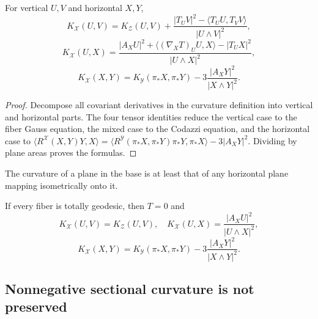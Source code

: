 \begin{theorem}
\label{thm:chow-ii-oneill-curvature-formulas}
For vertical \(U,V\) and horizontal \(X,Y\),
\[
 K_{\mathcal X}(U,V)=K_{\mathcal Z}(U,V)
 +\frac{|T_UV|^2-\langle T_UU,T_VV\rangle}{|U\wedge V|^2},
\]
\[
 K_{\mathcal X}(U,X)=
 \frac{|A_XU|^2+\langle(\nabla_XT)_UU,X\rangle-|T_UX|^2}{|U\wedge X|^2},
\]
\[
 K_{\mathcal X}(X,Y)=K_{\mathcal Y}(\pi_*X,\pi_*Y)
 -3\frac{|A_XY|^2}{|X\wedge Y|^2}.
\]
\end{theorem}
\begin{proof}
Decompose all covariant derivatives in the curvature definition into vertical
and horizontal parts.  The four tensor identities reduce the vertical case
to the fiber Gauss equation, the mixed case to the Codazzi equation, and the
horizontal case to
\(\langle R^{\mathcal X}(X,Y)Y,X\rangle
=\langle R^{\mathcal Y}(\pi_*X,\pi_*Y)\pi_*Y,\pi_*X\rangle-3|A_XY|^2\).
Dividing by plane areas proves the formulas.
\end{proof}

\begin{remark}
\label{rem:chow-ii-submersion-increases-curvature}
The curvature of a plane in the base is at least that of any horizontal plane
mapping isometrically onto it.
\end{remark}

\begin{remark}
\label{rem:chow-ii-oneill-totally-geodesic-fibers}
If every fiber is totally geodesic, then \(T=0\) and
\[
 K_{\mathcal X}(U,V)=K_{\mathcal Z}(U,V),\quad
 K_{\mathcal X}(U,X)=\frac{|A_XU|^2}{|U\wedge X|^2},
\]
\[
 K_{\mathcal X}(X,Y)=K_{\mathcal Y}(\pi_*X,\pi_*Y)
 -3\frac{|A_XY|^2}{|X\wedge Y|^2}.
\]
\end{remark}

\subsection{Nonnegative sectional curvature is not preserved}


